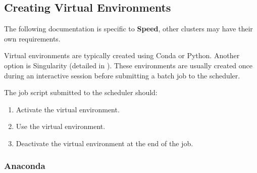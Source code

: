 \subsection{Creating Virtual Environments}
\label{sect:creating-venvs}
\label{sect:environments}
\label{sect:examples-venv}

The following documentation is specific to \textbf{Speed}, other clusters may have their own requirements.

Virtual environments are typically created using Conda or Python.
Another option is Singularity (detailed in ).
These environments are usually created once during an interactive session before
submitting a batch job to the scheduler.

The job script submitted to the scheduler should:
\begin{enumerate}
	\item Activate the virtual environment.
	\item Use the virtual environment.
	\item Deactivate the virtual environment at the end of the job.
\end{enumerate}

\subsubsection{Anaconda}
\label{sect:conda-venv}

